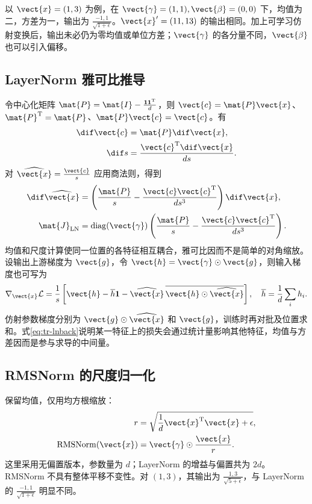 \documentclass[../textbook.tex]{subfiles}
\begin{document}
以 $\vect{x}=(1,3)$ 为例，在 $\vect{\gamma}=(1,1),\vect{\beta}=(0,0)$ 下，均值为二，方差为一，输出为 $\frac{-1,1}{\sqrt{1+\epsilon}}$。$\vect{x}'=(11,13)$ 的输出相同。加上可学习仿射变换后，输出未必仍为零均值或单位方差；$\vect{\gamma}$ 的各分量不同，$\vect{\beta}$ 也可以引入偏移。

\subsection{LayerNorm 雅可比推导}
令中心化矩阵 $\mat{P}=\mat{I}-\frac{\mathbf1\mathbf1^{\mathrm{T}}}{d}$，则 $\vect{c}=\mat{P}\vect{x}$、$\mat{P}^{\mathrm{T}}=\mat{P}$、$\mat{P}\vect{c}=\vect{c}$。有
\begin{equation}
 \begin{aligned}
  \dif \vect{c}&=\mat{P}\dif \vect{x},\\
  \dif s&=\frac{\vect{c}^{\mathrm{T}}\dif \vect{x}}{ds}.
 \end{aligned}
\end{equation}
对 $\widehat{\vect{x}}=\frac{\vect{c}}{s}$ 应用商法则，得到
\begin{equation}
 \begin{aligned}
  \dif\widehat{\vect{x}}&=
  \left(\frac{\mat{P}}s-\frac{\vect{c}\vect{c}^{\mathrm{T}}}{ds^3}\right)\dif \vect{x},\\
  \mat{J}_{\mathrm{LN}}&=\operatorname{diag}(\vect{\gamma})
  \left(\frac{\mat{P}}s-\frac{\vect{c}\vect{c}^{\mathrm{T}}}{ds^3}\right).
 \end{aligned}
\end{equation}
均值和尺度计算使同一位置的各特征相互耦合，雅可比因而不是简单的对角缩放。设输出上游梯度为 $\vect{g}$，令 $\vect{h}=\vect{\gamma}\odot \vect{g}$，则输入梯度也可写为
\begin{equation}\label{eq:tr-lnback}
 \nabla_{\vect{x}}\mathcal L=\frac1s
 \left[\vect{h}-\overline h\mathbf1-\widehat{\vect{x}}\,
 \overline{\vect{h}\odot\widehat{\vect{x}}}\right],
 \quad \overline h=\frac1d\sum_i h_i.
\end{equation}
仿射参数梯度分别为 $\vect{g}\odot\widehat{\vect{x}}$ 和 $\vect{g}$，训练时再对批及位置求和。式\eqref{eq:tr-lnback}说明某一特征上的损失会通过统计量影响其他特征，均值与方差因而是参与求导的中间量。

\subsection{RMSNorm 的尺度归一化}
保留均值，仅用均方根缩放\cite{zhang2019rmsnorm}：
\begin{equation}
 \begin{aligned}
  r&=\sqrt{\frac1d \vect{x}^{\mathrm{T}}\vect{x}+\epsilon},\\
  \operatorname{RMSNorm}(\vect{x})&=\vect{\gamma}\odot\frac{\vect{x}}r.
 \end{aligned}
\end{equation}
这里采用无偏置版本，参数量为 $d$；LayerNorm 的增益与偏置共为 $2d$。RMSNorm 不具有整体平移不变性。对 $(1,3)$，其输出为 $\frac{1,3}{\sqrt{5+\epsilon}}$，与 LayerNorm 的 $\frac{-1,1}{\sqrt{1+\epsilon}}$ 明显不同。
\end{document}
